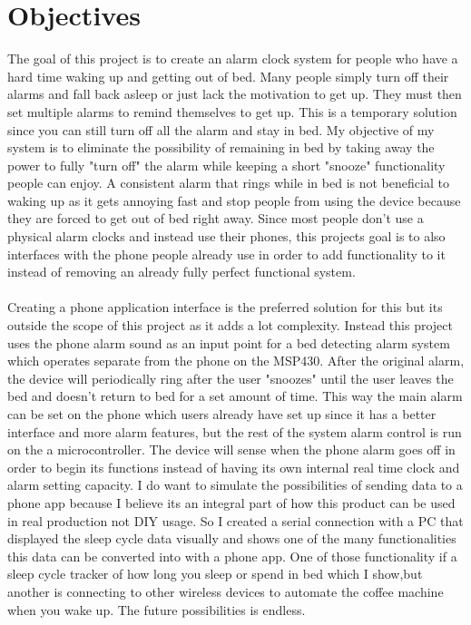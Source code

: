 \documentclass[11pt]{article}
\begin{document}
\section{Objectives}
The goal of this project is to create an alarm clock system for people who have a hard time waking up and getting out of bed.
Many people simply turn off their alarms and fall back asleep or just lack the motivation to get up.
They must then set multiple alarms to remind themselves to get up.
This is a temporary solution since you can still turn off all the alarm and stay in bed.
My objective of my system is to eliminate the possibility of remaining in bed by taking away the power to fully "turn off" the alarm while keeping a short "snooze" functionality people can enjoy. 
A consistent alarm that rings while in bed is not beneficial to waking up as it gets annoying fast and stop people from using the device because they are forced to get out of bed right away.  
Since most people don't use a physical alarm clocks and instead use their phones, this projects goal is to also interfaces with the phone people already use in order to add functionality to it instead of removing an already fully perfect functional system.\\
\\
Creating a phone application interface is the preferred solution for this but its outside the scope of this project as it adds a lot complexity. 
Instead this project uses the phone alarm sound as an input point for a bed detecting alarm system which operates separate from the phone on the MSP430.
After the original alarm, the device will periodically ring after the user "snoozes" until the user leaves the bed and doesn't return to bed for a set amount of time.
This way the main alarm can be set on the phone which users already have set up since it has a better interface and more alarm features, but the rest of the system alarm control is run on the a microcontroller. 
The device will sense when the phone alarm goes off in order to begin its functions instead of having its own internal real time clock and alarm setting capacity.
I do want to simulate the possibilities of sending data to a phone app because I believe its an integral part of how this product can be used in real production not DIY usage. 
So I created a serial connection with a PC that displayed the sleep cycle data visually and shows one of the many functionalities this data can be converted into with a phone app.
One of those functionality if a sleep cycle tracker of how long you sleep or spend in bed which I show,but another is connecting to other wireless devices to automate the coffee machine when you wake up.
The future possibilities is endless.\\
\\
\end{document}
